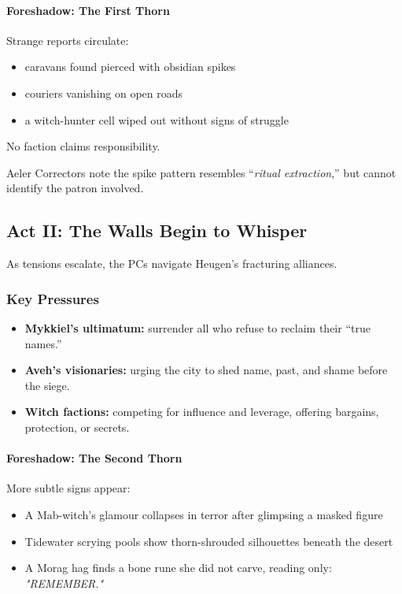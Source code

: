 \documentclass[11pt]{book}
\begin{document}
\paragraph{Foreshadow: The First Thorn}  
Strange reports circulate:
\begin{itemize}
    \item caravans found pierced with obsidian spikes  
    \item couriers vanishing on open roads  
    \item a witch-hunter cell wiped out without signs of struggle  
\end{itemize}

No faction claims responsibility.

Aeler Correctors note the spike pattern resembles ``\emph{ritual extraction},''  
but cannot identify the patron involved.

\subsection{Act II: The Walls Begin to Whisper}

As tensions escalate, the PCs navigate Heugen's fracturing alliances.

\subsubsection*{Key Pressures}
\begin{itemize}[leftmargin=*]
    \item \textbf{Mykkiel's ultimatum:} surrender all who refuse to reclaim their ``true names.''  
    \item \textbf{Aveh's visionaries:} urging the city to shed name, past, and shame before the siege.  
    \item \textbf{Witch factions:} competing for influence and leverage, offering bargains, protection, or secrets.  
\end{itemize}

\paragraph{Foreshadow: The Second Thorn}  
More subtle signs appear:
\begin{itemize}
    \item A Mab-witch's glamour collapses in terror after glimpsing a masked figure  
    \item Tidewater scrying pools show thorn-shrouded silhouettes beneath the desert  
    \item A Morag hag finds a bone rune she did not carve, reading only: \emph{"REMEMBER."}
\end{itemize}
\end{document}

